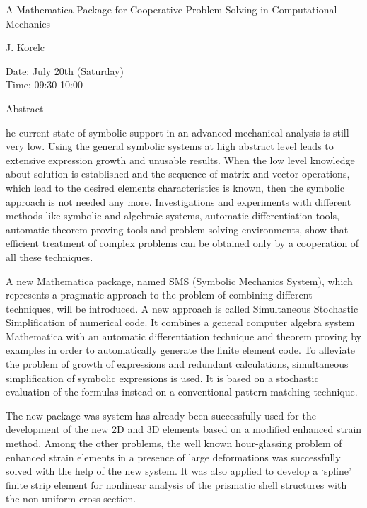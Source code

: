 \begin{center}
\LARGE
A Mathematica Package for Cooperative Problem Solving in
                   Computational Mechanics

\end{center}

\begin{center}
\Large
J. Korelc

\end{center}

\noindent
Date:  July 20th (Saturday)\\
Time:  09:30-10:00\\

\begin{center}
\large
Abstract
\end{center}

he current state of symbolic support in an advanced mechanical analysis is still very low. Using
the general symbolic systems at high abstract level leads to extensive expression growth and
unusable results. When the low level knowledge about solution is established and the sequence of
matrix and vector operations, which lead to the desired elements characteristics is known, then the
symbolic approach is not needed any more. Investigations and experiments with different methods
like symbolic and algebraic systems, automatic differentiation tools, automatic theorem proving
tools and problem solving environments, show that efficient treatment of complex problems can
be obtained only by a cooperation of all these techniques. 

A new Mathematica package, named SMS (Symbolic Mechanics System), which represents a
pragmatic approach to the problem of combining different techniques, will be introduced. A new
approach is called Simultaneous Stochastic Simplification of numerical code. It combines a
general computer algebra system Mathematica with an automatic differentiation technique and
theorem proving by examples in order to automatically generate the finite element code. To
alleviate the problem of growth of expressions and redundant calculations, simultaneous
simplification of symbolic expressions is used. It is based on a stochastic evaluation of the
formulas instead on a conventional pattern matching technique. 

The new package was system has already been successfully used for the development of the new
2D and 3D elements based on a modified enhanced strain method. Among the other problems, the
well known hour-glassing problem of enhanced strain elements in a presence of large
deformations was successfully solved with the help of the new system. It was also applied to
develop a `spline' finite strip element for nonlinear analysis of the prismatic shell structures with
the non uniform cross section. 

